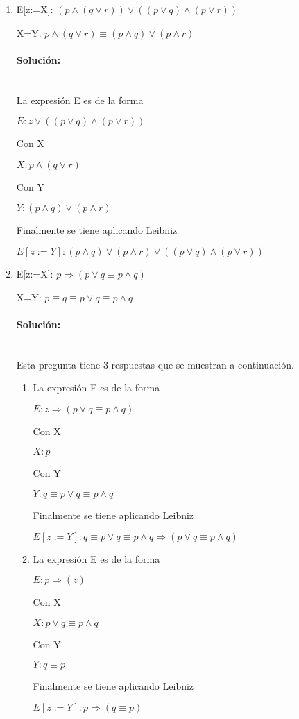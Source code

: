 \documentclass{article}
\newcommand{\myparagraph}[1]{\paragraph{#1}\mbox{}\\}
\begin{document}
\begin{enumerate}
\begin{enumerate}
		\item E[z:=X]: $(p \land (q \lor r)) \lor ((p \lor q) \land (p \lor r))$ \par
		 X=Y: $p \land (q \lor r) \equiv (p \land q) \lor (p \land r)$
		 
			\myparagraph{Solución:}
			\textlangle{} La expresión E es de la forma \textrangle\par
			$E: z \lor ((p \lor q) \land (p \lor r))$\par
			\textlangle{} Con X \textrangle\par
			$X: p \land (q \lor r)$\par
			\textlangle{} Con Y \textrangle\par
			$Y: (p \land q) \lor (p \land r)$\par
			\textlangle{} Finalmente se tiene aplicando Leibniz \textrangle\par
			$E[z:=Y]: (p \land q) \lor (p \land r) \lor ((p \lor q) \land (p \lor r))$\par
			\hspace{0.8cm}

		\item E[z:=X]: $p \Rightarrow (p \lor q \equiv p \land q)$ \par
		 X=Y: $p \equiv q \equiv p \lor q \equiv p \land q$
		 
			\myparagraph{Solución:}
			Esta pregunta tiene 3 respuestas que se muestran a continuación.
			\begin{enumerate}
				\item \textlangle{} La expresión E es de la forma \textrangle\par
				$E: z \Rightarrow (p \lor q \equiv p \land q)$\par
				\textlangle{} Con X \textrangle\par
				$X: p$\par
				\textlangle{} Con Y \textrangle\par
				$Y: q \equiv p \lor q \equiv p \land q$\par
				\textlangle{} Finalmente se tiene aplicando Leibniz \textrangle\par
				$E[z:=Y]: q \equiv p \lor q \equiv p \land q \Rightarrow (p \lor q \equiv p \land q)$\par
				\hspace{0.8cm}

				\item \textlangle{} La expresión E es de la forma \textrangle\par
				$E: p \Rightarrow (z)$\par
				\textlangle{} Con X \textrangle\par
				$X: p \lor q \equiv p \land q$\par
				\textlangle{} Con Y \textrangle\par
				$Y: q \equiv p$\par
				\textlangle{} Finalmente se tiene aplicando Leibniz \textrangle\par
				$E[z:=Y]: p \Rightarrow (q \equiv p)$\par
				\hspace{0.8cm}


\end{enumerate}
\end{enumerate}
\end{enumerate}
\end{document}
